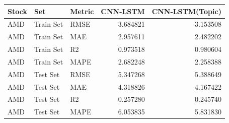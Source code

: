 \begin{tabular}{lllrr}
\toprule
Stock & Set & Metric & CNN-LSTM & CNN-LSTM(Topic) \\
\midrule
AMD & Train Set & RMSE & 3.684821 & 3.153508 \\
AMD & Train Set & MAE & 2.957611 & 2.482202 \\
AMD & Train Set & R2 & 0.973518 & 0.980604 \\
AMD & Train Set & MAPE & 2.682248 & 2.258388 \\
AMD & Test Set & RMSE & 5.347268 & 5.388649 \\
AMD & Test Set & MAE & 4.318826 & 4.167422 \\
AMD & Test Set & R2 & 0.257280 & 0.245740 \\
AMD & Test Set & MAPE & 6.053835 & 5.831830 \\
\bottomrule
\end{tabular}

